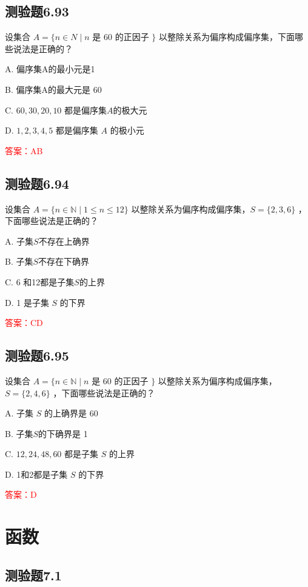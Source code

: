 \documentclass[UTF8, heading=true]{ctexart}
\begin{document}
\subsection{测验题6.93}

设集合 $A=\{n \in N \mid n$ 是 60 的正因子 $\}$ 以整除关系为偏序构成偏序集，下面哪些说法是正确的？

A. 偏序集A的最小元是1

B. 偏序集A的最大元是 60

C. $60,30,20,10$ 都是偏序集$A$的极大元

D. $1,2,3,4,5$ 都是偏序集 $A$ 的极小元

\textcolor{red}{答案：AB}

\subsection{测验题6.94}

设集合 $A=\{n \in \mathbb{N} \mid 1 \leq n \leq 12\}$ 以整除关系为偏序构成偏序集，$S=\{2,3,6\}$ ，下面哪些说法是正确的？

A. 子集$S$不存在上确界

B. 子集$S$不存在下确界

C. 6 和12都是子集$S$的上界

D. 1 是子集 $S$ 的下界

\textcolor{red}{答案：CD}

\subsection{测验题6.95}

设集合 $A=\{n \in \mathbb{N} \mid n$ 是 60 的正因子 $\}$ 以整除关系为偏序构成偏序集，$S=\{2,4,6\}$ ，下面哪些说法是正确的？

A. 子集 $S$ 的上确界是 60

B. 子集$S$的下确界是 1

C. $12,24,48,60$ 都是子集 $S$ 的上界

D. 1和2都是子集 $S$ 的下界

\textcolor{red}{答案：D}




\clearpage

\section{函数}

\subsection{测验题7.1}
\end{document}
